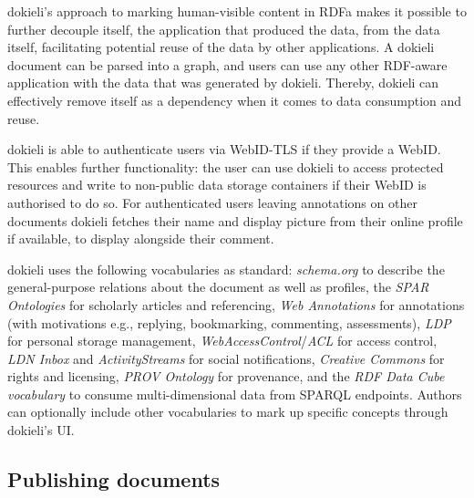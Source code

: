 \documentclass[a4paper]{llncs}
\begin{document}
                                    
\par dokieli’s approach to marking human-visible content in RDFa makes it possible to further decouple itself, the application that produced the data, from the data itself, facilitating potential reuse of the data by other applications. A dokieli document can be parsed into a graph, and users can use any other RDF-aware application with the data that was generated by dokieli. Thereby, dokieli can effectively remove itself as a dependency when it comes to data consumption and reuse.

                                    
\par dokieli is able to authenticate users via WebID-TLS if they provide a WebID. This enables further functionality: the user can use dokieli to access protected resources and write to non-public data storage containers if their WebID is authorised to do so. For authenticated users leaving annotations on other documents dokieli fetches their name and display picture from their online profile if available, to display alongside their comment. 

                                    
\par dokieli uses the following vocabularies as standard: \textit{schema.org} to describe the general-purpose relations about the document as well as profiles, the \textit{SPAR Ontologies} for scholarly articles and referencing, \textit{Web Annotations} for annotations (with motivations e.g., replying, bookmarking, commenting, assessments), \textit{LDP} for personal storage management, \textit{WebAccessControl}/\textit{ACL} for access control, \textit{LDN Inbox} and \textit{ActivityStreams} for social notifications, \textit{Creative Commons} for rights and licensing, \textit{PROV Ontology} for provenance, and the \textit{RDF Data Cube vocabulary} to consume multi-dimensional data from SPARQL endpoints. Authors can optionally include other vocabularies to mark up specific concepts through dokieli’s UI.
                                
                            

                            
                                \subsection{Publishing documents}
  \label{publishing-documents}

                                
                                    
\end{document}
